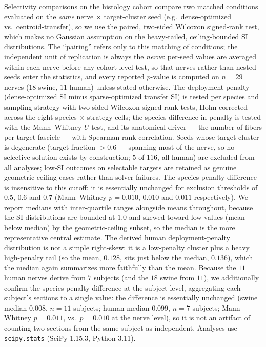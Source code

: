 Selectivity comparisons on the histology cohort compare two matched
conditions evaluated on the \emph{same} nerve $\times$ target-cluster
seed (e.g.\ dense-optimized vs.\ centroid-transfer), so we use the
paired, two-sided Wilcoxon signed-rank test, which makes no Gaussian
assumption on the heavy-tailed, ceiling-bounded SI distributions.  The
``pairing'' refers only to this matching of conditions; the independent
unit of replication is always the \emph{nerve}: per-seed values are
averaged within each nerve before any cohort-level test, so that nerves
rather than nested seeds enter the statistics, and every reported
$p$-value is computed on $n = 29$ nerves ($18$ swine, $11$ human)
unless stated otherwise.  The deployment penalty (dense-optimized SI minus
sparse-optimized transfer SI) is tested per species and sampling
strategy with two-sided Wilcoxon signed-rank tests, Holm-corrected
across the eight species $\times$ strategy cells; the species
difference in penalty is tested with the Mann--Whitney $U$ test, and its
anatomical driver --- the number of fibers per target fascicle --- with
Spearman rank correlation.  Seeds whose target cluster is degenerate
(target fraction $> 0.6$ --- spanning most of the nerve, so no selective
solution exists by construction; $5$ of $116$, all human) are excluded
from all analyses; low-SI outcomes on selectable targets are retained as
genuine geometric-ceiling cases rather than solver failures.  The
species penalty difference is insensitive to this cutoff: it is
essentially unchanged for exclusion thresholds of $0.5$, $0.6$ and
$0.7$ (Mann--Whitney $p = 0.010$, $0.010$ and $0.011$ respectively).  We
report medians with inter-quartile ranges alongside means throughout,
because the SI distributions are bounded at $1.0$ and skewed toward
low values (mean below median) by the geometric-ceiling subset, so the
median is the more representative central estimate.  The derived
human deployment-penalty distribution is not a simple right-skew: it is
a low-penalty cluster plus a heavy high-penalty tail (so the mean,
$0.128$, sits just below the median, $0.136$), which the median again
summarizes more faithfully than the mean.  Because the $11$ human nerves derive from $7$
subjects (and the $18$ swine from $11$), we additionally confirm the
species penalty difference at the subject level, aggregating each
subject's sections to a single value: the difference is essentially
unchanged (swine median $0.008$, $n=11$ subjects; human median $0.099$,
$n=7$ subjects; Mann--Whitney $p = 0.011$, vs.\ $p = 0.010$ at the
nerve level), so it is not an artifact of counting two sections from the
same subject as independent.  Analyses use \texttt{scipy.stats} (SciPy 1.15.3, Python 3.11).
